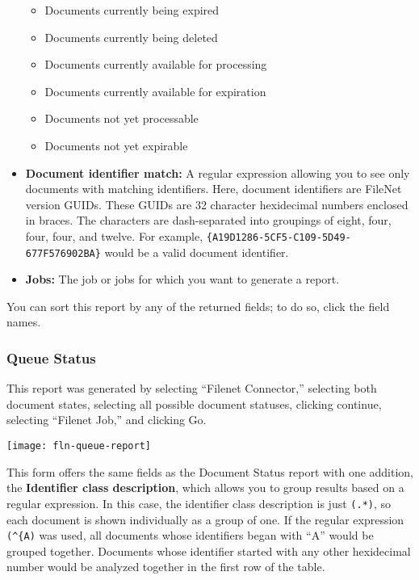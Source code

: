 \begin{changemargin}{1.5in}{0in}
\begin{itemize}
\begin{itemize}
\item Documents currently being expired

\item Documents currently being deleted

\item Documents currently available for processing

\item Documents currently available for expiration

\item Documents not yet processable

\item Documents not yet expirable

\end{itemize}

\item \textbf{Document identifier match:} \label{docid} A regular
expression allowing you to see only documents with matching
identifiers. Here, document identifiers are FileNet version
GUIDs. These GUIDs are 32 character hexidecimal numbers enclosed in
braces. The characters are dash-separated into groupings of eight,
four, four, four, and twelve. For example,
\texttt{\{A19D1286-5CF5-C109-5D49-}\linebreak\texttt{677F576902BA\}}
would be a valid document identifier.

\item \textbf{Jobs:} The job or jobs for which you want to generate
a report.

\end{itemize}

You can sort this report by any of the returned fields; to do so,
click the field names.

\subsubsection{Queue Status}

This report was generated by selecting ``Filenet
Connector,'' selecting both document states, selecting all possible
document statuses, clicking continue, selecting ``Filenet Job,''
and clicking Go.

\texttt{[image: fln-queue-report]}

This form offers the same fields as the Document Status report with
one addition, the \textbf{Identifier class description}, which allows
you to group results based on a regular expression. In this case, the
identifier class description is just \texttt{(.*)}, so each document
is shown individually as a group of one. If the regular expression
\texttt{(\^{}\{A)} was used, all documents whose identifiers began with
``A'' would be grouped together. Documents whose identifier started
with any other hexidecimal number would be analyzed together in the
first row of the table.



\end{changemargin}
